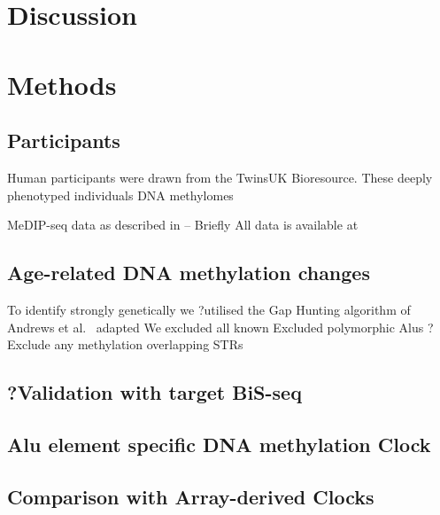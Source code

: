 \documentclass[
]{book}
\begin{document}
\newpage

\hypertarget{discussion-3}{%
\chapter{Discussion}\label{discussion-3}}

\newpage

\hypertarget{methods-3}{%
\chapter{Methods}\label{methods-3}}

\hypertarget{participants-1}{%
\section{Participants}\label{participants-1}}

Human participants were drawn from the TwinsUK Bioresource.
These deeply phenotyped individuals DNA methylomes

MeDIP-seq data as described in \citep{Bell2017a} -- Briefly All data is available at

\hypertarget{age-related-dna-methylation-changes}{%
\section{Age-related DNA methylation changes}\label{age-related-dna-methylation-changes}}

To identify strongly genetically we ?utilised the Gap Hunting algorithm of Andrews et al.~\citep{Andrews2016} adapted
We excluded all known
Excluded polymorphic Alus \citep{Payer2017}
?Exclude any methylation overlapping STRs

\hypertarget{validation-with-target-bis-seq}{%
\section{?Validation with target BiS-seq}\label{validation-with-target-bis-seq}}

\hypertarget{alu-element-specific-dna-methylation-clock-1}{%
\section{Alu element specific DNA methylation Clock}\label{alu-element-specific-dna-methylation-clock-1}}

\hypertarget{comparison-with-array-derived-clocks}{%
\section{Comparison with Array-derived Clocks}\label{comparison-with-array-derived-clocks}}
\end{document}
